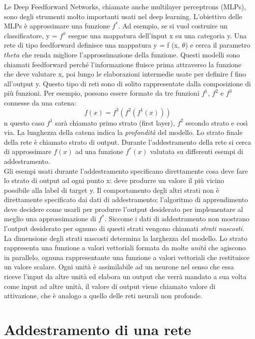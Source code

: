      Le Deep Feedforward Networks, chiamate anche multilayer perceptrons (MLPs), sono degli
     strumenti molto importanti usati nel deep learning. L’obiettivo delle MLPs è approssimare
     una funzione $f^{*}$. Ad esempio, se si vuol costruire un classificatore, y = $f^{x}$ esegue una mappatura
     dell’input x su una categoria y. Una rete di tipo feedforward definisce una mappatura 
     y = f (x, \(\theta\)) e cerca il parametro \(theta\) che renda migliore l’approssimazione
      della funzione.
     Questi modelli sono chiamati feedforward perché l’informazione fluisce prima attraverso
     la funzione che deve valutare x, poi lungo le elaborazioni intermedie usate per definire f
     fino all’output y. 
     Questo tipo di reti sono di solito rappresentate dalla composizione di più funzioni. Per
esempio, possono essere formate da tre funzioni $f^{1}$, $f^{2}$ e $f^{3}$ connesse da una catena:
 $$f(x) = f^{3}(f^{2}(f^{1}(x)))$$
n questo caso $f^{1}$ sarà chiamato primo strato (first layer), $f^{2}$ secondo strato e così via.
La lunghezza della catena indica la \emph{profondità} del modello. Lo strato finale della rete è
chiamato strato di output. Durante l’addestramento della rete si cerca di approssimare 
$f (x)$ ad una funzione $f^{*}(x)$ valutata su differenti esempi di addestramento. \\
Gli esempi usati durante l’addestramento specificano direttamente cosa deve fare lo strato
di output ad ogni punto x: deve produrre un valore il più vicino possibile alla label di target y. Il 
comportamento degli altri strati non è direttamente specificato dai dati di addestramento;
l’algoritmo di apprendimento deve decidere come usarli per produrre l’output desiderato
per implementare al meglio una approssimazione di $f^{*}$. Siccome i dati di addestramento 
non mostrano l’output desiderato per ognuno di questi strati vengono chiamati \emph{strati
nascosti}. La dimensione degli strati nascosti determina la larghezza del modello.
Lo strato rappresenta una funzione a valori vettoriali formata da molte \emph{unità} che agiscono in
parallelo, ognuna rappresentante una funzione a valori vettoriali che restituisce un valore
scalare. Ogni unità è assimilabile ad un neurone nel senso che essa riceve l’input da altre
unità ed elabora un output che verrà mandato a sua volta come input ad altre unità, il
valore di output viene chiamato valore di attivazione, che è analogo a quello delle reti neurali non profonde. 
\section{Addestramento di una rete}

